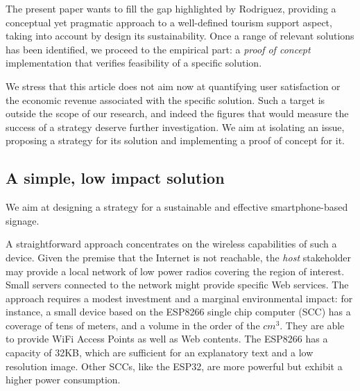 \documentclass[sustainability,article,submit,pdftex,moreauthors]{Definitions/mdpi}
\begin{document}
The present paper wants to fill the gap highlighted by Rodriguez, providing a conceptual yet pragmatic approach to a well-defined tourism support aspect, taking into account by design its sustainability. Once a range of relevant solutions has been identified, we proceed to the empirical part: a {\em proof of concept} implementation that verifies feasibility of a specific solution.

We stress that this article does not aim now at quantifying user satisfaction or the economic revenue associated with the specific solution. Such a target is outside the scope of our research, and indeed the figures that would measure the success of a strategy deserve further investigation. We aim at isolating an issue, proposing a strategy for its solution and implementing a proof of concept for it.





\subsection{A simple, low impact solution}


We aim at designing a strategy for a sustainable and effective smartphone-based signage.

A straightforward approach concentrates on the wireless capabilities of such a device. Given the premise that the Internet is not reachable, the {\em host} stakeholder may provide a local network of low power radios covering the region of interest. Small servers connected to the network might provide specific Web services. The approach requires a modest investment and a marginal environmental impact: for instance, a small device based on the ESP8266 single chip computer (SCC) has a coverage of tens of meters, and a volume in the order of the $cm^3$. They are able to provide WiFi Access Points as well as Web contents. The ESP8266 has a capacity of 32KB, which are sufficient for an explanatory text and a low resolution image. Other SCCs, like the ESP32, are more powerful but exhibit a higher power consumption. 
\end{document}
